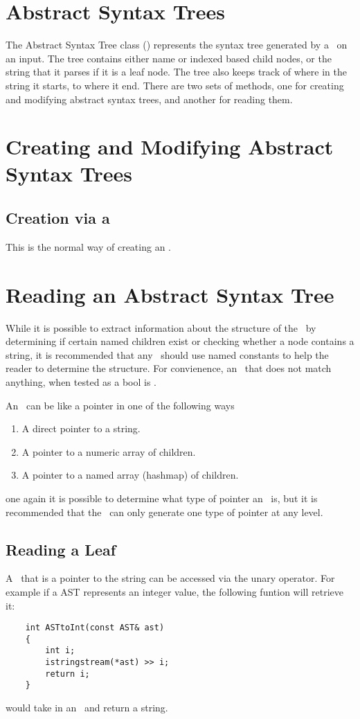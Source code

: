 \section{Abstract Syntax Trees}
The Abstract Syntax Tree class (\AST) represents the syntax tree generated by a \grammar\ on an input.
    The tree contains either name or indexed based child nodes, or the string that it parses if it is a leaf node.
    The tree also keeps track of where in the string it starts, to where it end.
    There are two sets of methods, one for creating and modifying abstract syntax trees, and another for reading them.

\section{Creating and Modifying Abstract Syntax Trees}

\subsection{Creation via a \Grammar}
This is the normal way of creating an \AST.

\section{Reading an Abstract Syntax Tree}
While it is possible to extract information about the structure of the \AST\ 
    by determining if certain named children exist or checking whether a node contains a string,
    it is recommended that any \grammar\ should use named constants to help the reader to determine the structure.
    For convienence, an \AST\ that does not match anything, when tested as a bool is \code{false}.

An \AST\ can be like a pointer in one of the following ways
    \begin{enumerate}
        \item A direct pointer to a string.
        \item A pointer to a numeric array of children.
        \item A pointer to a named array (hashmap) of children.
    \end{enumerate}
    one again it is possible to determine what type of pointer an \AST\ is,
    but it is recommended that the \grammar\ can only generate one type of pointer at any level.

\subsection{Reading a Leaf}
A \AST\ that is a pointer to the string can be accessed via the unary \code{*} operator.
    For example if a AST represents an integer value, the following funtion will retrieve it:
    \begin{verbatim}
    int ASTtoInt(const AST& ast)
    {
        int i;
        istringstream(*ast) >> i;
        return i;
    }
    \end{verbatim}
    would take in an \AST\ and return a string.

